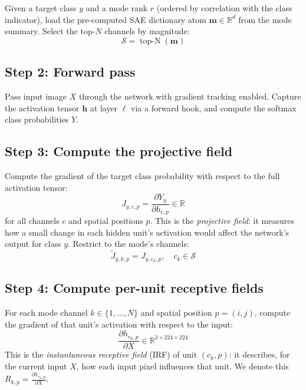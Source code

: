 \documentclass[11pt]{article}
\begin{document}
Given a target class $y$ and a mode rank $r$ (ordered by correlation with the class indicator), load the pre-computed SAE dictionary atom $\mathbf{m} \in \mathbb{R}^d$ from the mode summary.
Select the top-$N$ channels by magnitude:
\begin{equation}
    \mathcal{S} = \operatorname{top\text{-}N}(\mathbf{m})
\end{equation}

\subsection{Step 2: Forward pass}

Pass input image $X$ through the network with gradient tracking enabled.
Capture the activation tensor $\mathbf{h}$ at layer $\ell$ via a forward hook, and compute the softmax class probabilities $Y$.

\subsection{Step 3: Compute the projective field}

Compute the gradient of the target class probability with respect to the full activation tensor:
\begin{equation}
    J_{y,c,p} = \frac{\partial Y_y}{\partial h_{c,p}} \in \mathbb{R}
\end{equation}
for all channels $c$ and spatial positions $p$.
This is the \emph{projective field}: it measures how a small change in each hidden unit's activation would affect the network's output for class $y$.
Restrict to the mode's channels:
\begin{equation}
    \tilde{J}_{y,k,p} = J_{y,c_k,p}, \quad c_k \in \mathcal{S}
\end{equation}

\subsection{Step 4: Compute per-unit receptive fields}

For each mode channel $k \in \{1,\ldots,N\}$ and spatial position $p = (i,j)$, compute the gradient of that unit's activation with respect to the input:
\begin{equation}
    \frac{\partial h_{c_k, p}}{\partial X} \in \mathbb{R}^{3 \times 224 \times 224}
\end{equation}
This is the \emph{instantaneous receptive field} (IRF) of unit $(c_k, p)$: it describes, for the current input $X$, how each input pixel influences that unit.
We denote this $R_{k,p} = \frac{\partial h_{c_k,p}}{\partial X}$.
\end{document}

